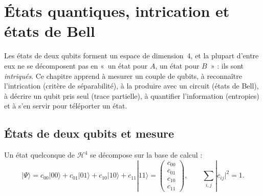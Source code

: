 
\providecommand{\ket}[1]{|#1\rangle}
\providecommand{\bra}[1]{\langle #1|}
\providecommand{\braket}[2]{\langle #1|#2\rangle}

\section{États quantiques, intrication et états de Bell}\label{chap:bell}

Les états de deux qubits forment un espace de dimension~$4$, et la plupart d'entre eux ne se
décomposent pas en «~un état pour $A$, un état pour $B$~» : ils sont \emph{intriqués}. Ce chapitre
apprend à mesurer un couple de qubits, à reconnaître l'intrication (critère de séparabilité), à la
produire avec un circuit (états de Bell), à décrire un qubit pris seul (trace partielle), à
quantifier l'information (entropies) et à s'en servir pour téléporter un état.

\subsection{États de deux qubits et mesure}\label{sec:mesure2}

Un état quelconque de $\mathcal{H}^4$ se décompose sur la base de calcul :
\[
  \ket{\Psi}=c_{00}\ket{00}+c_{01}\ket{01}+c_{10}\ket{10}+c_{11}\ket{11}
  =\begin{pmatrix}c_{00}\\ c_{01}\\ c_{10}\\ c_{11}\end{pmatrix},
  \qquad \sum_{i,j}|c_{ij}|^2=1 .
\]

